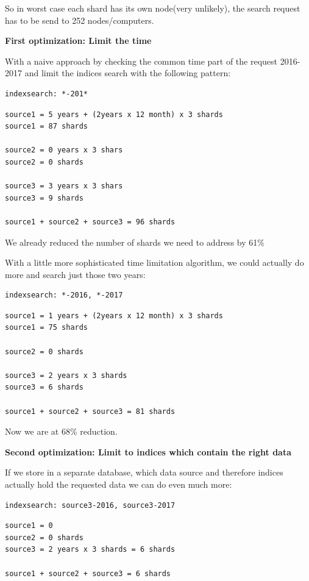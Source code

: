 So in worst case each shard has its own node(very unlikely), the search
request has to be send to 252 nodes/computers.

\textbf{First optimization: Limit the time}

With a naive approach by checking the common time part of the request
2016-2017 and limit the indices search with the following pattern:

\begin{verbatim}
indexsearch: *-201*
\end{verbatim}

\begin{verbatim}
source1 = 5 years + (2years x 12 month) x 3 shards
source1 = 87 shards

source2 = 0 years x 3 shars
source2 = 0 shards

source3 = 3 years x 3 shars
source3 = 9 shards

source1 + source2 + source3 = 96 shards
\end{verbatim}

We already reduced the number of shards we need to address by 61\%

With a little more sophisticated time limitation algorithm, we could
actually do more and search just those two years:

\begin{verbatim}
indexsearch: *-2016, *-2017
\end{verbatim}

\begin{verbatim}
source1 = 1 years + (2years x 12 month) x 3 shards
source1 = 75 shards

source2 = 0 shards

source3 = 2 years x 3 shards
source3 = 6 shards

source1 + source2 + source3 = 81 shards
\end{verbatim}

Now we are at 68\% reduction.

\textbf{Second optimization: Limit to indices which contain the right
data}

If we store in a separate database, which data source and therefore
indices actually hold the requested data we can do even much more:

\begin{verbatim}
indexsearch: source3-2016, source3-2017
\end{verbatim}

\begin{verbatim}
source1 = 0
source2 = 0 shards
source3 = 2 years x 3 shards = 6 shards

source1 + source2 + source3 = 6 shards
\end{verbatim}

